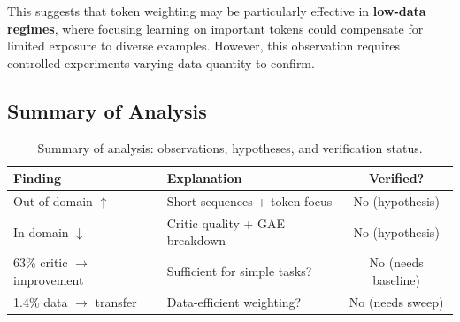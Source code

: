 This suggests that token weighting may be particularly effective in \textbf{low-data regimes}, where focusing learning on important tokens could compensate for limited exposure to diverse examples. However, this observation requires controlled experiments varying data quantity to confirm.

\subsection{Summary of Analysis}

\begin{table}[h]
\centering
\caption{Summary of analysis: observations, hypotheses, and verification status.}
\label{tab:analysis_summary}
\begin{tabular}{lp{6cm}c}
\toprule
\textbf{Finding} & \textbf{Explanation} & \textbf{Verified?} \\
\midrule
Out-of-domain $\uparrow$ & Short sequences + token focus & No (hypothesis) \\
In-domain $\downarrow$ & Critic quality + GAE breakdown & No (hypothesis) \\
63\% critic $\rightarrow$ improvement & Sufficient for simple tasks? & No (needs baseline) \\
1.4\% data $\rightarrow$ transfer & Data-efficient weighting? & No (needs sweep) \\
\bottomrule
\end{tabular}
\end{table}
